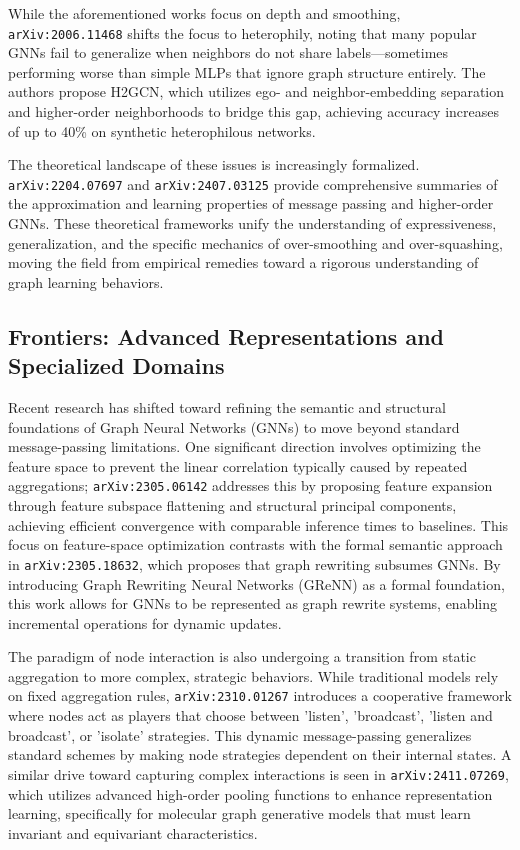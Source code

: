 \documentclass[11pt]{article}
\begin{document}
While the aforementioned works focus on depth and smoothing, \texttt{arXiv:2006.11468} shifts the focus to heterophily, noting that many popular GNNs fail to generalize when neighbors do not share labels—sometimes performing worse than simple MLPs that ignore graph structure entirely. The authors propose H2GCN, which utilizes ego- and neighbor-embedding separation and higher-order neighborhoods to bridge this gap, achieving accuracy increases of up to 40\% on synthetic heterophilous networks.

The theoretical landscape of these issues is increasingly formalized. \texttt{arXiv:2204.07697} and \texttt{arXiv:2407.03125} provide comprehensive summaries of the approximation and learning properties of message passing and higher-order GNNs. These theoretical frameworks unify the understanding of expressiveness, generalization, and the specific mechanics of over-smoothing and over-squashing, moving the field from empirical remedies toward a rigorous understanding of graph learning behaviors.

\subsection{Frontiers: Advanced Representations and Specialized Domains}

Recent research has shifted toward refining the semantic and structural foundations of Graph Neural Networks (GNNs) to move beyond standard message-passing limitations. One significant direction involves optimizing the feature space to prevent the linear correlation typically caused by repeated aggregations; \texttt{arXiv:2305.06142} addresses this by proposing feature expansion through feature subspace flattening and structural principal components, achieving efficient convergence with comparable inference times to baselines. This focus on feature-space optimization contrasts with the formal semantic approach in \texttt{arXiv:2305.18632}, which proposes that graph rewriting subsumes GNNs. By introducing Graph Rewriting Neural Networks (GReNN) as a formal foundation, this work allows for GNNs to be represented as graph rewrite systems, enabling incremental operations for dynamic updates.

The paradigm of node interaction is also undergoing a transition from static aggregation to more complex, strategic behaviors. While traditional models rely on fixed aggregation rules, \texttt{arXiv:2310.01267} introduces a cooperative framework where nodes act as players that choose between 'listen', 'broadcast', 'listen and broadcast', or 'isolate' strategies. This dynamic message-passing generalizes standard schemes by making node strategies dependent on their internal states. A similar drive toward capturing complex interactions is seen in \texttt{arXiv:2411.07269}, which utilizes advanced high-order pooling functions to enhance representation learning, specifically for molecular graph generative models that must learn invariant and equivariant characteristics.
\end{document}
